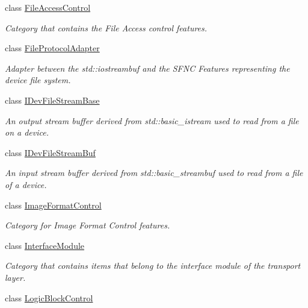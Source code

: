 \begin{DoxyCompactItemize}
class \hyperlink{classmv_i_m_p_a_c_t_1_1acquire_1_1_gen_i_cam_1_1_file_access_control}{File\+Access\+Control}
\begin{DoxyCompactList}\small\item\em Category that contains the File Access control features. \end{DoxyCompactList}\item 
class \hyperlink{classmv_i_m_p_a_c_t_1_1acquire_1_1_gen_i_cam_1_1_file_protocol_adapter}{File\+Protocol\+Adapter}
\begin{DoxyCompactList}\small\item\em Adapter between the std\+::iostreambuf and the S\+F\+N\+C Features representing the device file system. \end{DoxyCompactList}\item 
class \hyperlink{classmv_i_m_p_a_c_t_1_1acquire_1_1_gen_i_cam_1_1_i_dev_file_stream_base}{I\+Dev\+File\+Stream\+Base}
\begin{DoxyCompactList}\small\item\em An output stream buffer derived from std\+::basic\+\_\+istream used to read from a file on a device. \end{DoxyCompactList}\item 
class \hyperlink{classmv_i_m_p_a_c_t_1_1acquire_1_1_gen_i_cam_1_1_i_dev_file_stream_buf}{I\+Dev\+File\+Stream\+Buf}
\begin{DoxyCompactList}\small\item\em An input stream buffer derived from std\+::basic\+\_\+streambuf used to read from a file of a device. \end{DoxyCompactList}\item 
class \hyperlink{classmv_i_m_p_a_c_t_1_1acquire_1_1_gen_i_cam_1_1_image_format_control}{Image\+Format\+Control}
\begin{DoxyCompactList}\small\item\em Category for Image Format Control features. \end{DoxyCompactList}\item 
class \hyperlink{classmv_i_m_p_a_c_t_1_1acquire_1_1_gen_i_cam_1_1_interface_module}{Interface\+Module}
\begin{DoxyCompactList}\small\item\em Category that contains items that belong to the interface module of the transport layer. \end{DoxyCompactList}\item 
class \hyperlink{classmv_i_m_p_a_c_t_1_1acquire_1_1_gen_i_cam_1_1_logic_block_control}{Logic\+Block\+Control}

\end{DoxyCompactItemize}
